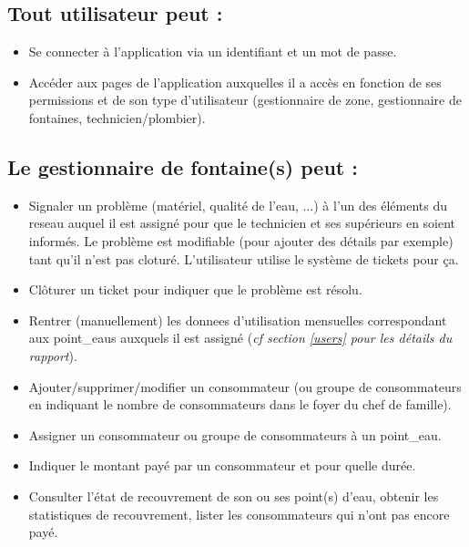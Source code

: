 \documentclass[a4paper, 11pt]{article}
\begin{document}
\subsection{Tout \gls{utilisateur} peut :}
\begin{itemize}
  \item Se connecter à l'\gls{application} via un identifiant et un mot de passe.
  \item Accéder aux pages de l'\gls{application} auxquelles il a accès en fonction de ses \glspl{permission} et de son type d'\gls{utilisateur} (gestionnaire de \gls{zone}, gestionnaire de \glspl{fontaine}, technicien/plombier).
\end{itemize}

\subsection{Le gestionnaire de \gls{fontaine}(s) peut :}
\begin{itemize}
  \item Signaler un problème (matériel, qualité de l'eau, ...) à l'un des éléments du \gls{reseau} auquel il est assigné pour que le technicien et ses supérieurs en soient informés. Le problème est modifiable (pour ajouter des détails par exemple) tant qu'il n'est pas cloturé. L'utilisateur utilise le système de \glspl{ticket} pour ça.
  \item Clôturer un \gls{ticket} pour indiquer que le problème est résolu.
  \item Rentrer (manuellement) les \glspl{donnee} d'utilisation mensuelles correspondant aux \glspl{point_eau} auxquels il est assigné (\emph{cf section \ref{users} pour les détails du rapport}).
  \item Ajouter/supprimer/modifier un \gls{consommateur} (ou groupe de \glspl{consommateur} en indiquant le nombre de \glspl{consommateur} dans le foyer du chef de famille).
  \item Assigner un \gls{consommateur} ou groupe de \glspl{consommateur} à un \gls{point_eau}.
  \item Indiquer le montant payé par un \gls{consommateur} et pour quelle durée.
  \item Consulter l'état de recouvrement de son ou ses point(s) d'eau, obtenir les statistiques de recouvrement, lister les \glspl{consommateur} qui n'ont pas encore payé.
\end{itemize}
\end{document}
